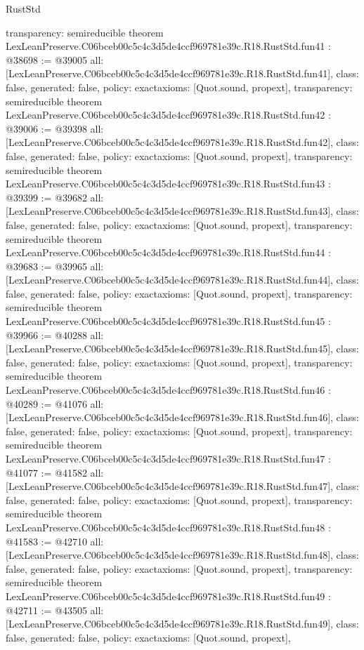 \begin{lexlean}{RustStd}
\begin{coremodule}
{  transparency: semireducible
}
theorem LexLeanPreserve.C06bceb00c5c4c3d5de4ccf969781e39c.R18.RustStd.fun41 : @38698 := @39005 {
  all: [LexLeanPreserve.C06bceb00c5c4c3d5de4ccf969781e39c.R18.RustStd.fun41],
  class: false,
  generated: false,
  policy: exact{axioms: [Quot.sound, propext]},
  transparency: semireducible
}
theorem LexLeanPreserve.C06bceb00c5c4c3d5de4ccf969781e39c.R18.RustStd.fun42 : @39006 := @39398 {
  all: [LexLeanPreserve.C06bceb00c5c4c3d5de4ccf969781e39c.R18.RustStd.fun42],
  class: false,
  generated: false,
  policy: exact{axioms: [Quot.sound, propext]},
  transparency: semireducible
}
theorem LexLeanPreserve.C06bceb00c5c4c3d5de4ccf969781e39c.R18.RustStd.fun43 : @39399 := @39682 {
  all: [LexLeanPreserve.C06bceb00c5c4c3d5de4ccf969781e39c.R18.RustStd.fun43],
  class: false,
  generated: false,
  policy: exact{axioms: [Quot.sound, propext]},
  transparency: semireducible
}
theorem LexLeanPreserve.C06bceb00c5c4c3d5de4ccf969781e39c.R18.RustStd.fun44 : @39683 := @39965 {
  all: [LexLeanPreserve.C06bceb00c5c4c3d5de4ccf969781e39c.R18.RustStd.fun44],
  class: false,
  generated: false,
  policy: exact{axioms: [Quot.sound, propext]},
  transparency: semireducible
}
theorem LexLeanPreserve.C06bceb00c5c4c3d5de4ccf969781e39c.R18.RustStd.fun45 : @39966 := @40288 {
  all: [LexLeanPreserve.C06bceb00c5c4c3d5de4ccf969781e39c.R18.RustStd.fun45],
  class: false,
  generated: false,
  policy: exact{axioms: [Quot.sound, propext]},
  transparency: semireducible
}
theorem LexLeanPreserve.C06bceb00c5c4c3d5de4ccf969781e39c.R18.RustStd.fun46 : @40289 := @41076 {
  all: [LexLeanPreserve.C06bceb00c5c4c3d5de4ccf969781e39c.R18.RustStd.fun46],
  class: false,
  generated: false,
  policy: exact{axioms: [Quot.sound, propext]},
  transparency: semireducible
}
theorem LexLeanPreserve.C06bceb00c5c4c3d5de4ccf969781e39c.R18.RustStd.fun47 : @41077 := @41582 {
  all: [LexLeanPreserve.C06bceb00c5c4c3d5de4ccf969781e39c.R18.RustStd.fun47],
  class: false,
  generated: false,
  policy: exact{axioms: [Quot.sound, propext]},
  transparency: semireducible
}
theorem LexLeanPreserve.C06bceb00c5c4c3d5de4ccf969781e39c.R18.RustStd.fun48 : @41583 := @42710 {
  all: [LexLeanPreserve.C06bceb00c5c4c3d5de4ccf969781e39c.R18.RustStd.fun48],
  class: false,
  generated: false,
  policy: exact{axioms: [Quot.sound, propext]},
  transparency: semireducible
}
theorem LexLeanPreserve.C06bceb00c5c4c3d5de4ccf969781e39c.R18.RustStd.fun49 : @42711 := @43505 {
  all: [LexLeanPreserve.C06bceb00c5c4c3d5de4ccf969781e39c.R18.RustStd.fun49],
  class: false,
  generated: false,
  policy: exact{axioms: [Quot.sound, propext]},
}
\end{coremodule}
\end{lexlean}
